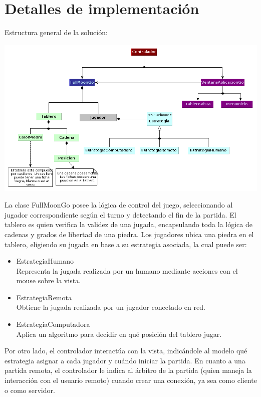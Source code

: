 \documentclass[11pt]{article}
\begin{document}
\newpage
\section{Detalles de implementación}
\label{sec-4}

Estructura general de la soluci\'on:

\begin{center}
 \includegraphics[scale=0.55]{./Diagramas/DiagramaClases/diagrama_de_clases.png}
\end{center}

La clase FullMoonGo posee la l\'ogica de control del juego, seleccionando al jugador correspondiente seg\'un el turno y
detectando el fin de la partida. El tablero es quien verifica la validez de una jugada, encapsulando toda la l\'ogica de cadenas y grados de libertad de una piedra.
Los jugadores ubica una piedra en el tablero, eligiendo su jugada en base a su estrategia asociada, la cual puede ser:
\begin{itemize}
 \item EstrategiaHumano\\
      Representa la jugada realizada por un humano mediante acciones con el mouse sobre la vista.
 \item EstrategiaRemota\\
      Obtiene la jugada realizada por un jugador conectado en red.
 \item	EstrategiaComputadora \\
      Aplica un algoritmo para decidir en qu\'e posici\'on del tablero jugar.
\end{itemize}

Por otro lado, el controlador interact\'ua con la vista, indic\'andole al modelo qu\'e estrategia asignar a cada jugador y
cu\'ando iniciar la partida. En cuanto a una partida remota, el controlador le indica al \'arbitro de la partida (quien maneja la interacci\'on 
con el usuario remoto) cuando crear una conexi\'on, ya sea como cliente o como servidor.
\end{document}
